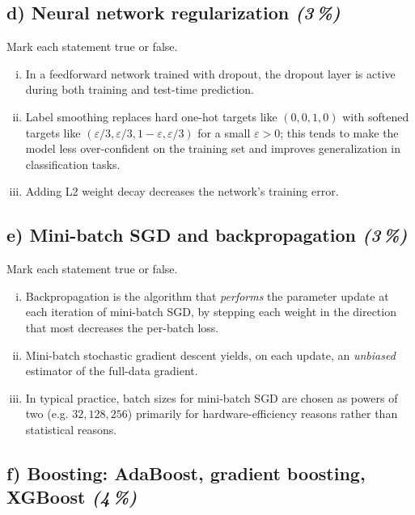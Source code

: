 \documentclass[11pt,a4paper]{article}
\newcommand{\subpoints}[1]{\textit{(#1\,\%)}}
\begin{document}
\subsection*{d) Neural network regularization \subpoints{3}}
Mark each statement true or false.
\begin{enumerate}[(i)]
  \item In a feedforward network trained with dropout, the dropout layer is active during both training and test-time prediction.
  \item Label smoothing replaces hard one-hot targets like $(0, 0, 1, 0)$ with softened targets like $(\varepsilon/3, \varepsilon/3, 1-\varepsilon, \varepsilon/3)$ for a small $\varepsilon > 0$; this tends to make the model less over-confident on the training set and improves generalization in classification tasks.
  \item Adding L2 weight decay decreases the network's training error.
\end{enumerate}

\subsection*{e) Mini-batch SGD and backpropagation \subpoints{3}}
Mark each statement true or false.
\begin{enumerate}[(i)]
  \item Backpropagation is the algorithm that \emph{performs} the parameter update at each iteration of mini-batch SGD, by stepping each weight in the direction that most decreases the per-batch loss.
  \item Mini-batch stochastic gradient descent yields, on each update, an \emph{unbiased} estimator of the full-data gradient.
  \item In typical practice, batch sizes for mini-batch SGD are chosen as powers of two (e.g. $32, 128, 256$) primarily for hardware-efficiency reasons rather than statistical reasons.
\end{enumerate}

\subsection*{f) Boosting: AdaBoost, gradient boosting, XGBoost \subpoints{4}}
\end{document}
